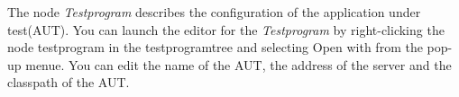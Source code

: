 \item[testprogram]{
The node \emph{Testprogram} describes the configuration of the application under test(AUT). You can launch the editor for the \emph{Testprogram} by right-clicking the node testprogram in the testprogramtree and selecting Open with from the pop-up menue. You can edit the name of the AUT, the address of the server and the classpath of the AUT.
}







